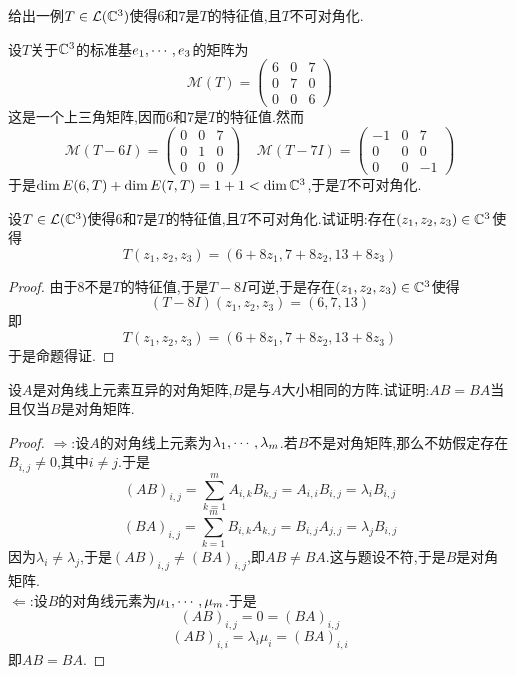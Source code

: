\documentclass{ctexart}
\begin{document}
\begin{problem}[11.]
    给出一例$T\in\mathcal{L}(\mathbb{C}^3)$使得$6$和$7$是$T$的特征值,且$T$不可对角化.
\end{problem}
\begin{solution}
    设$T$关于$\mathbb{C}^3$的标准基${e}_1,\cdots,{e}_{3}$的矩阵为
    \[\mathcal{M}(T)=\begin{pmatrix}
        6&0&7\\0&7&0\\0&0&6
    \end{pmatrix}\]
    这是一个上三角矩阵,因而$6$和$7$是$T$的特征值.然而
    \[\mathcal{M}(T-6I)=\begin{pmatrix}
        0&0&7\\0&1&0\\0&0&0
    \end{pmatrix}\ \ \ \ \ 
    \mathcal{M}(T-7I)=\begin{pmatrix}
        -1&0&7\\0&0&0\\0&0&-1
    \end{pmatrix}\]
    于是$\dim E(6,T)+\dim E(7,T)=1+1<\dim\mathbb{C}^3$,于是$T$不可对角化.
\end{solution}
\begin{problem}[12.]
    设$T\in\mathcal{L}(\mathbb{C}^3)$使得$6$和$7$是$T$的特征值,且$T$不可对角化.试证明:存在$(z_1,z_2,z_3)\in\mathbb{C}^3$使得
    \[T(z_1,z_2,z_3)=(6+8z_1,7+8z_2,13+8z_3)\]
\end{problem}
\begin{proof}
    由于$8$不是$T$的特征值,于是$T-8I$可逆,于是存在$(z_1,z_2,z_3)\in\mathbb{C}^3$使得
    \[(T-8I)(z_1,z_2,z_3)=(6,7,13)\]
    即
    \[T(z_1,z_2,z_3)=(6+8z_1,7+8z_2,13+8z_3)\]
    于是命题得证.
\end{proof}
\begin{problem}[13.]
    设$A$是对角线上元素互异的对角矩阵,$B$是与$A$大小相同的方阵.试证明:$AB=BA$当且仅当$B$是对角矩阵.
\end{problem}
\begin{proof}
    $\Rightarrow$:设$A$的对角线上元素为${\lambda}_1,\cdots,{\lambda}_{m}$.若$B$不是对角矩阵,那么不妨假定存在$B_{i,j}\neq0$,其中$i\neq j$.于是
    \[(AB)_{i,j}=\sum_{k=1}^{m}A_{i,k}B_{k,j}=A_{i,i}B_{i,j}=\lambda_iB_{i,j}\]
    \[(BA)_{i,j}=\sum_{k=1}^{m}B_{i,k}A_{k,j}=B_{i,j}A_{j,j}=\lambda_jB_{i,j}\]
    因为$\lambda_i\neq\lambda_j$,于是$(AB)_{i,j}\neq(BA)_{i,j}$,即$AB\neq BA$.这与题设不符,于是$B$是对角矩阵.\\
    $\Leftarrow$:设$B$的对角线元素为${\mu}_1,\cdots,{\mu}_{m}$.于是
    \[(AB)_{i,j}=0=(BA)_{i,j}\]
    \[(AB)_{i,i}=\lambda_i\mu_i=(BA)_{i,i}\]
    即$AB=BA$.
\end{proof}
\end{document}
